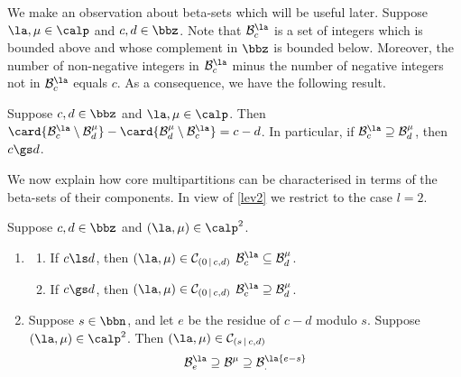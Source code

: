 \documentclass[a4paper, 11pt, twoside]{article}
\begin{document}
We make an observation about beta-sets which will be useful later. Suppose $\la,\mu\in\calp$ and $c,d\in\bbz$. Note that $\ber\la c$ is a set of integers which is bounded above and whose complement in $\bbz$ is bounded below. Moreover, the number of non-negative integers in $\ber\la c$ minus the number of negative integers not in $\ber\la c$ equals $c$. As a consequence, we have the following result.

\begin{lemma}\label{betaobs}
Suppose $c,d\in\bbz$ and $\la,\mu\in\calp$. Then $\card{\ber\la c\setminus\ber\mu d}-\card{\ber\mu d\setminus\ber\la c}=c-d$. In particular, if $\ber\la c\supseteq\ber\mu d$, then $c\gs d$.
\end{lemma}

We now explain how core multipartitions can be characterised in terms of the beta-sets of their components. In view of \cref{lev2} we restrict to the case $l=2$.%

\begin{propn}\label{sbetacore}
Suppose $c,d\in\bbz$ and $(\la,\mu)\in\calp^2$.
\begin{enumerate}[ref=\cref{sbetacore}(\arabic*)]
\item\label{s0betacore}
\begin{enumerate}
\item
If $c\ls d$, then $(\la,\mu)\in\mc0{c,d}$ \iff $\ber\la c\subseteq\ber\mu d$.
\item
If $c\gs d$, then $(\la,\mu)\in\mc0{c,d}$ \iff $\ber\la c\supseteq\ber\mu d$.
\end{enumerate}
\item\label{sposbetacore}
Suppose $s\in\bbn$, and let $e$ be the residue of $c-d$ modulo $s$. Suppose $(\la,\mu)\in\calp^2$. Then $(\la,\mu)\in\mc s{c,d}$ \iff
\[
\ber\la e\supseteq\be\mu\supseteq\ber\la{e-s}.
\]
\end{enumerate}
\end{propn}
\end{document}
